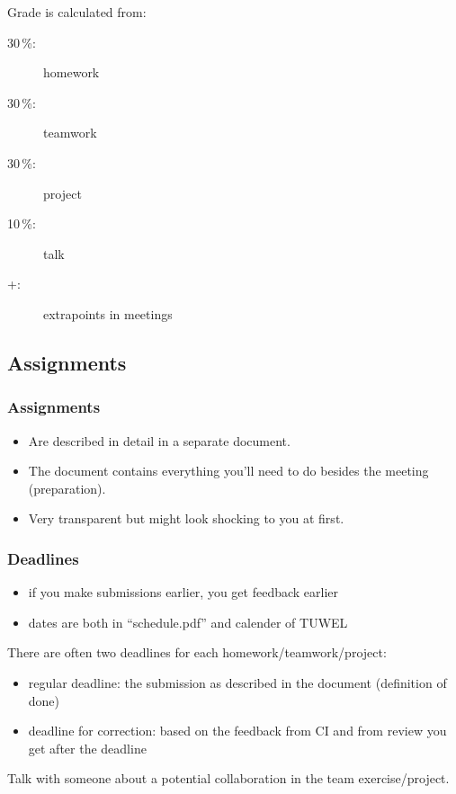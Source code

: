 \begin{frame}
	Grade is calculated from:
	\begin{description}
	\item[30\,\%:] homework
	\item[30\,\%:] teamwork
	\item[30\,\%:] project
	\item[10\,\%:] talk
	\item[+:] extrapoints in meetings
	\end{description}
\end{frame}

\subsection{Assignments}
\begin{frame}
	\frametitle{Assignments}
	\begin{itemize}
		\item Are described in detail in a separate document.
		\item The document contains everything you'll need to do besides the meeting (preparation).
		\item Very transparent but might look shocking to you at first.
	\end{itemize}
\end{frame}

\begin{frame}
	\frametitle{Deadlines}

	\begin{itemize}
	\item if you make submissions earlier, you get feedback earlier
	\item dates are both in ``schedule.pdf'' and calender of TUWEL
	\end{itemize}

	There are often two deadlines for each homework/teamwork/project:

	\begin{itemize}
	\item regular deadline: the submission as described in the document (definition of done)
	\item deadline for correction: based on the feedback from CI and from review you get after the deadline
	\end{itemize}
\end{frame}

\begin{assignment}
	\begin{task}
	Talk with someone about a potential collaboration in the team exercise/project.
	\end{task}
\end{assignment}

